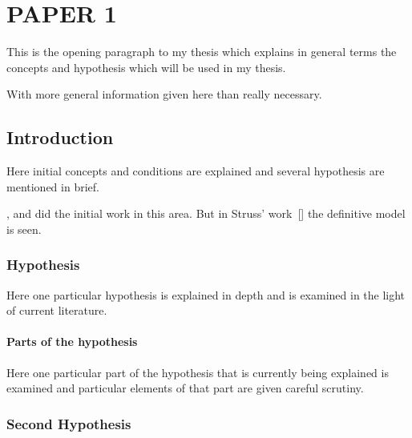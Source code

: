 \chapter{PAPER 1}

This is the opening paragraph to my thesis which
explains in general terms the concepts and hypothesis
which will be used in my thesis.

With more general information given here than really
necessary.

\section{Introduction}

Here initial concepts and conditions are explained and
several hypothesis are mentioned in brief.

\cite{allen}, \cite{bruner} and \cite{cox}
did the initial work in this area. But in Struss' work~[\cite{struss}]
the definitive model is seen.

\subsection{Hypothesis}

Here one particular hypothesis is explained in depth
and is examined in the light of current literature.

\subsubsection{Parts of the hypothesis}

Here one particular part of the hypothesis that is 
currently being explained is examined and particular
elements of that part are given careful scrutiny.


\subsection{Second Hypothesis}

